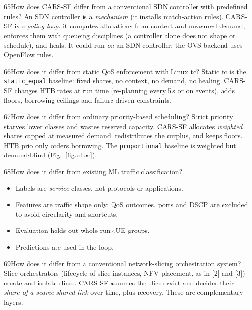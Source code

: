 \begin{qa}{65}{How does CARS-SF differ from a conventional SDN controller with predefined rules?}
An SDN controller is a \emph{mechanism} (it installs match-action rules). CARS-SF is a \emph{policy loop}: it computes
allocations from context and measured demand, enforces them with queueing disciplines (a controller alone does
not shape or schedule), and heals. It could run \emph{on} an SDN controller; the OVS backend uses OpenFlow
 rules.
\end{qa}

\begin{qa}{66}{How does it differ from static QoS enforcement with Linux tc?}
Static tc is the \texttt{static\_equal} baseline: fixed shares, no context, no demand, no healing. CARS-SF changes HTB
rates at run time (re-planning every 5\,s or on events), adds floors, borrowing ceilings and failure-driven
constraints.
\end{qa}

\begin{qa}{67}{How does it differ from ordinary priority-based scheduling?}
Strict priority starves lower classes and wastes reserved capacity. CARS-SF allocates \emph{weighted} shares capped at
measured demand, redistributes the surplus, and keeps floors. HTB prio only orders borrowing.
The \texttt{proportional} baseline is weighted but demand-blind (Fig.~\ref{fig:alloc}).
\end{qa}

\begin{qa}{68}{How does it differ from existing ML traffic classification?}
\begin{itemize}
\item Labels are \emph{service} classes, not protocols or applications.
\item Features are traffic shape only; QoS outcomes, ports and DSCP are excluded to avoid circularity and shortcuts.
\item Evaluation holds out whole run$\times$UE groups.
\item Predictions are used in the loop.
\end{itemize}
\end{qa}

\begin{qa}{69}{How does it differ from a conventional network-slicing orchestration system?}
Slice orchestrators (lifecycle of slice instances, NFV placement, as in [2] and [3]) create and isolate slices. CARS-SF
assumes the slices exist and decides their \emph{share of a scarce shared link} over time, plus recovery.
These are complementary layers.
\end{qa}

